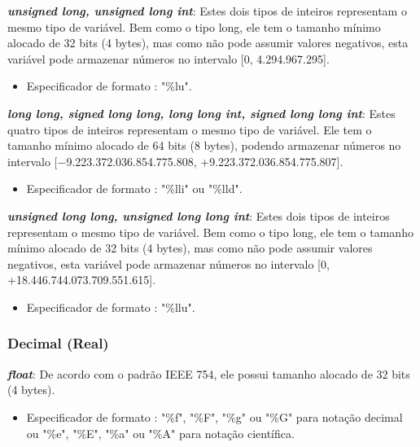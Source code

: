 \documentclass[12pt]{article}
\begin{document}
\hspace{0.2cm}
\par\textbf{\textit{unsigned long, unsigned long int}}: Estes dois tipos de inteiros representam o mesmo tipo de variável. Bem como o tipo long, ele tem o tamanho mínimo alocado de 32 bits (4 bytes), mas como não pode assumir valores negativos, esta variável pode armazenar números no intervalo [0, 4.294.967.295].

\begin{itemize}
    \item Especificador de formato : "\%lu".
\end{itemize}

\hspace{0.2cm}
\par\textbf{\textit{long long, signed long long, long long int, signed long long int}}: Estes quatro tipos de inteiros representam o mesmo tipo de variável. Ele tem o tamanho mínimo alocado de 64 bits (8 bytes), podendo armazenar números no intervalo [−9.223.372.036.854.775.808, +9.223.372.036.854.775.807].

\begin{itemize}
    \item Especificador de formato : "\%lli" ou "\%lld".
\end{itemize}

\hspace{0.2cm}
\par\textbf{\textit{unsigned long long, unsigned long long int}}: Estes dois tipos de inteiros representam o mesmo tipo de variável. Bem como o tipo long, ele tem o tamanho mínimo alocado de 32 bits (4 bytes), mas como não pode assumir valores negativos, esta variável pode armazenar números no intervalo [0, +18.446.744.073.709.551.615].

\begin{itemize}
    \item Especificador de formato : "\%llu".
\end{itemize}

\subsubsection{Decimal (Real)}

\par\textbf{\textit{float}}: De acordo com o padrão IEEE 754, ele possui tamanho alocado de 32 bits (4 bytes).\cite{wiki:c_data_types}

\begin{itemize}
    \item Especificador de formato : "\%f", "\%F", "\%g" ou "\%G" para notação decimal ou "\%e", "\%E", "\%a" ou "\%A" para notação científica.
\end{itemize}
\end{document}
